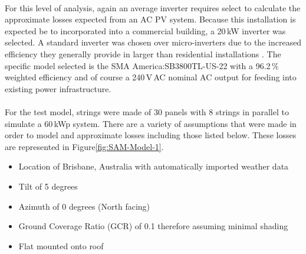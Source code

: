\paragraph{}
For this level of analysis, again an average inverter requires select to calculate the approximate losses expected from an AC PV system. Because this installation is expected be to incorporated into a commercial building, a 20\,kW inverter was selected. A standard inverter was chosen over micro-inverters due to the increased efficiency they generally provide in larger than residential installations \cite{MicroInverterThesis}. The specific model selected is the SMA America:SB3800TL-US-22 with a 96.2\,\% weighted efficiency and of course a 240\,V\,AC nominal AC output for feeding into existing power infrastructure. 

\paragraph{}
For the test model, strings were made of 30 panels with 8 strings in parallel to simulate a 60\,kWp system. There are a variety of assumptions that were made in order to model and approximate losses including those listed below. These losses are represented in Figure\ref{fig:SAM-Model-1}. 

\begin{itemize}[noitemsep,nolistsep]
	\item Location of Brisbane, Australia with automatically imported weather data
	\item Tilt of 5 degrees
	\item Azimuth of 0 degrees (North facing)
	\item Ground Coverage Ratio (GCR) of 0.1 therefore assuming minimal shading
	\item Flat mounted onto roof
\end{itemize}

